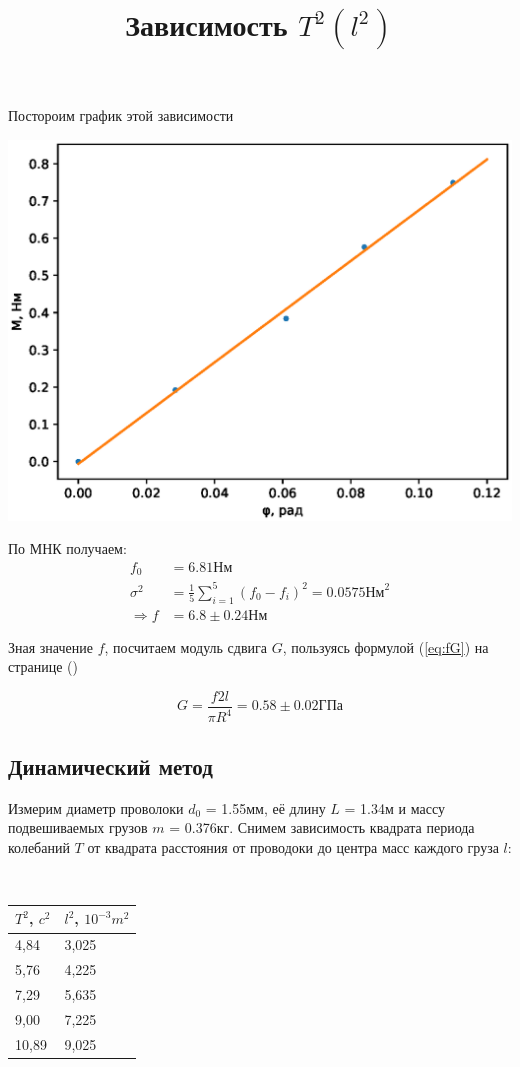 \documentclass[a4paper, 12pt]{article}
\begin{document}
\newpage

Постороим график этой зависимости

\includegraphics[scale = 0.7]{static.eps}

По МНК получаем:
\begin{align*}
f_0 &= 6.81 \text{Нм} \\
\sigma^2 &= \frac{1}{5}\sum_{i=1}^5 (f_0 - f_i)^2 = 0.0575 \text{Нм}^2 \\
\Rightarrow f &= 6.8 \pm 0.24 \text{Нм}
\end{align*}

Зная значение $f$, посчитаем модуль сдвига $G$, пользуясь формулой (\ref{eq:fG}) на странице (\pageref{eq:fG})

\[
G = \frac{f2l}{\pi R^4} = 0.58 \pm 0.02 \text{ГПа}
\]

\subsection{Динамический метод}

Измерим диаметр проволоки $d_0$ = 1.55мм, её длину $L$ = 1.34м и массу подвешиваемых грузов $m$ = 0.376кг.
Снимем зависимость квадрата периода колебаний $T$ от квадрата расстояния от проводоки до центра масс каждого груза $l$:

\newpage
\begin{center}
\title{Зависимость $T^2(l^2)$} \\
\begin{tabular}{|l|l|}
\hline
$T^2$, $c^2$ & $l^2$, $10^{-3}m^2$ \\ \hline
4,84   & 3,025  \\ \hline
5,76   & 4,225  \\ \hline
7,29   & 5,635  \\ \hline
9,00   & 7,225  \\ \hline
10,89  & 9,025  \\ \hline
\end{tabular}
\end{center}
\end{document}
